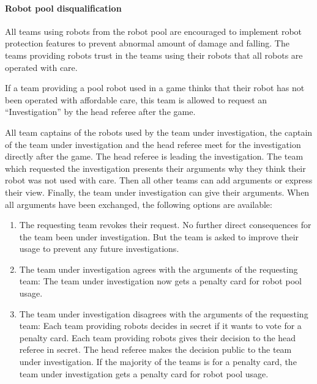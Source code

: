         \paragraph{Robot pool disqualification}
            All teams using robots from the robot pool are encouraged to implement robot protection features to prevent abnormal amount of damage and falling. The teams providing robots trust in the teams using their robots that all robots are operated with care.

            If a team providing a pool robot used in a game thinks that their robot has not been operated with affordable care, this team is allowed to request an ``Investigation'' by the head referee after the game.

            All team captains of the robots used by the team under investigation, the captain of the team under investigation and the head referee meet for the investigation directly after the game. The head referee is leading the investigation. The team which requested the investigation presents their arguments why they think their robot was not used with care. Then all other teams can add arguments or express their view. Finally, the team under investigation can give their arguments.
            When all arguments have been exchanged, the following options are available:

            \begin{enumerate}
                \item The requesting team revokes their request. No further direct consequences for the team been under investigation. But the team is asked to improve their usage to prevent any future investigations.
                \item The team under investigation agrees with the arguments of the requesting team: The team under investigation now gets a penalty card for robot pool usage.
                \item The team under investigation disagrees with the arguments of the requesting team: Each team providing robots decides in secret if it wants to vote for a penalty card. Each team providing robots gives their decision to the head referee in secret. The head referee makes the decision public to the team under investigation. If the majority of the teams is for a penalty card, the team under investigation gets a penalty card for robot pool usage.
            \end{enumerate}

